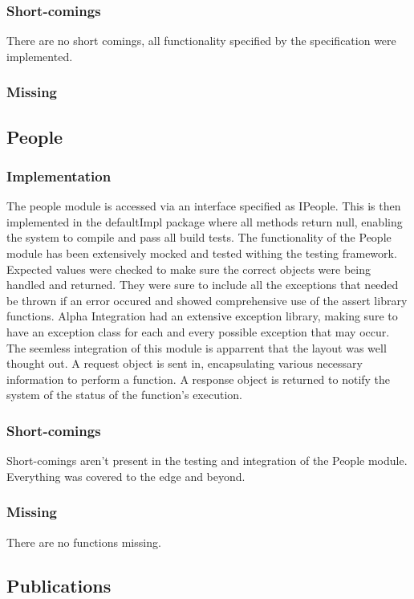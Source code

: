 \documentclass{article}
\begin{document}
		\subsubsection{Short-comings}
		There are no short comings, all functionality specified by the specification were implemented.
		\subsubsection{Missing}
		
	\subsection{People}
		\subsubsection{Implementation}
		The people module is accessed via an interface specified as IPeople. This is then implemented in the defaultImpl package where all methods return null, enabling the system to compile and pass all build tests. The functionality of the People module has been extensively mocked and tested withing the testing framework. Expected values were checked to make sure the correct objects were being handled and returned. They were sure to include all the exceptions that needed be thrown if an error occured and showed comprehensive use of the assert library functions. Alpha Integration had an extensive exception library, making sure to have an exception class for each and every possible exception that may occur. The seemless integration of this module is apparrent that the layout was well thought out. A request object is sent in, encapsulating various necessary information to perform a function. A response object is returned to notify the system of the status of the function's execution.
		\subsubsection{Short-comings}
		Short-comings aren't present in the testing and integration of the People module. Everything was covered to the edge and beyond.
		\subsubsection{Missing}
		There are no functions missing.
		
	\subsection{Publications}
\end{document}

